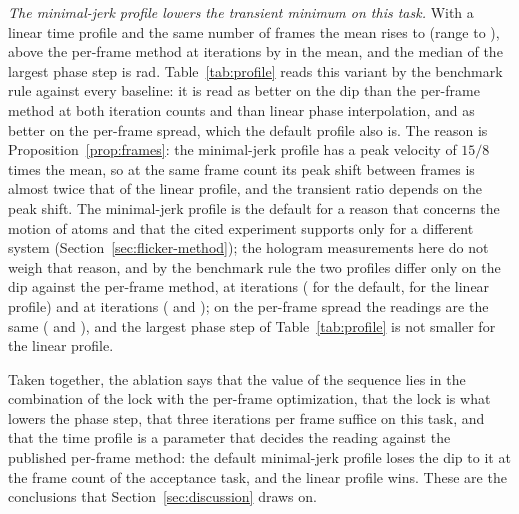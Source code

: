 \emph{The minimal-jerk profile lowers the transient minimum on this task.} With a linear time profile and the same number of frames the mean rises to \ablTLinearMean{} (range \ablTLinearMin{} to \ablTLinearMax{}), above the per-frame method at \parKimIters{} iterations by \linearGap{} in the mean, and the median of the largest phase step is \ablTLinearStep{} rad. Table~\ref{tab:profile} reads this variant by the benchmark rule against every baseline: it is read as better on the dip than the per-frame method at both iteration counts and than linear phase interpolation, and as better on the per-frame spread, which the default profile also is. The reason is Proposition~\ref{prop:frames}: the minimal-jerk profile has a peak velocity of $15/8$ times the mean, so at the same frame count its peak shift between frames is almost twice that of the linear profile, and the transient ratio depends on the peak shift. The minimal-jerk profile is the default for a reason that concerns the motion of atoms and that the cited experiment supports only for a different system (Section~\ref{sec:flicker-method}); the hologram measurements here do not weigh that reason, and by the benchmark rule the two profiles differ only on the dip against the per-frame method, at \parKimIters{} iterations (\readProfileDefaultKimFiveDip{} for the default, \readProfileLinearKimFiveDip{} for the linear profile) and at \parFrameIters{} iterations (\readProfileDefaultKimTenDip{} and \readProfileLinearKimTenDip{}); on the per-frame spread the readings are the same (\readProfileDefaultKimFiveSigma{} and \readProfileLinearKimFiveSigma{}), and the largest phase step of Table~\ref{tab:profile} is not smaller for the linear profile.

Taken together, the ablation says that the value of the sequence lies in the combination of the lock with the per-frame optimization, that the lock is what lowers the phase step, that three iterations per frame suffice on this task, and that the time profile is a parameter that decides the reading against the published per-frame method: the default minimal-jerk profile loses the dip to it at the frame count of the acceptance task, and the linear profile wins. These are the conclusions that Section~\ref{sec:discussion} draws on.
